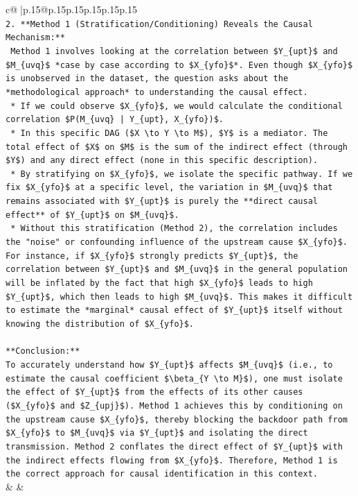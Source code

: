 \documentclass{article}
\begin{document}
{\begin{supertabular}{c@{$\;$}|p{.15\linewidth}@{}p{.15\linewidth}p{.15\linewidth}p{.15\linewidth}p{.15\linewidth}p{.15\linewidth}}
{{{\\ 
\texttt{2.  **Method 1 (Stratification/Conditioning) Reveals the Causal Mechanism:**} \\
\texttt{    Method 1 involves looking at the correlation between \$Y\_\{upt\}\$ and \$M\_\{uvq\}\$ *case by case according to \$X\_\{yfo\}\$*. Even though \$X\_\{yfo\}\$ is unobserved in the dataset, the question asks about the *methodological approach* to understanding the causal effect.} \\
\texttt{    *   If we could observe \$X\_\{yfo\}\$, we would calculate the conditional correlation \$P(M\_\{uvq\} | Y\_\{upt\}, X\_\{yfo\})\$.} \\
\texttt{    *   In this specific DAG (\$X \textbackslash{}to Y \textbackslash{}to M\$), \$Y\$ is a mediator. The total effect of \$X\$ on \$M\$ is the sum of the indirect effect (through \$Y\$) and any direct effect (none in this specific description).} \\
\texttt{    *   By stratifying on \$X\_\{yfo\}\$, we isolate the specific pathway. If we fix \$X\_\{yfo\}\$ at a specific level, the variation in \$M\_\{uvq\}\$ that remains associated with \$Y\_\{upt\}\$ is purely the **direct causal effect** of \$Y\_\{upt\}\$ on \$M\_\{uvq\}\$.} \\
\texttt{    *   Without this stratification (Method 2), the correlation includes the "noise" or confounding influence of the upstream cause \$X\_\{yfo\}\$. For instance, if \$X\_\{yfo\}\$ strongly predicts \$Y\_\{upt\}\$, the correlation between \$Y\_\{upt\}\$ and \$M\_\{uvq\}\$ in the general population will be inflated by the fact that high \$X\_\{yfo\}\$ leads to high \$Y\_\{upt\}\$, which then leads to high \$M\_\{uvq\}\$. This makes it difficult to estimate the *marginal* causal effect of \$Y\_\{upt\}\$ itself without knowing the distribution of \$X\_\{yfo\}\$.} \\
\\ 
\texttt{**Conclusion:**} \\
\texttt{To accurately understand how \$Y\_\{upt\}\$ affects \$M\_\{uvq\}\$ (i.e., to estimate the causal coefficient \$\textbackslash{}beta\_\{Y \textbackslash{}to M\}\$), one must isolate the effect of \$Y\_\{upt\}\$ from the effects of its other causes (\$X\_\{yfo\}\$ and \$Z\_\{upj\}\$). Method 1 achieves this by conditioning on the upstream cause \$X\_\{yfo\}\$, thereby blocking the backdoor path from \$X\_\{yfo\}\$ to \$M\_\{uvq\}\$ via \$Y\_\{upt\}\$ and isolating the direct transmission. Method 2 conflates the direct effect of \$Y\_\{upt\}\$ with the indirect effects flowing from \$X\_\{yfo\}\$. Therefore, Method 1 is the correct approach for causal identification in this context.} \\
            }
        }
    }
    & & \\ \\


\end{supertabular}}
\end{document}
